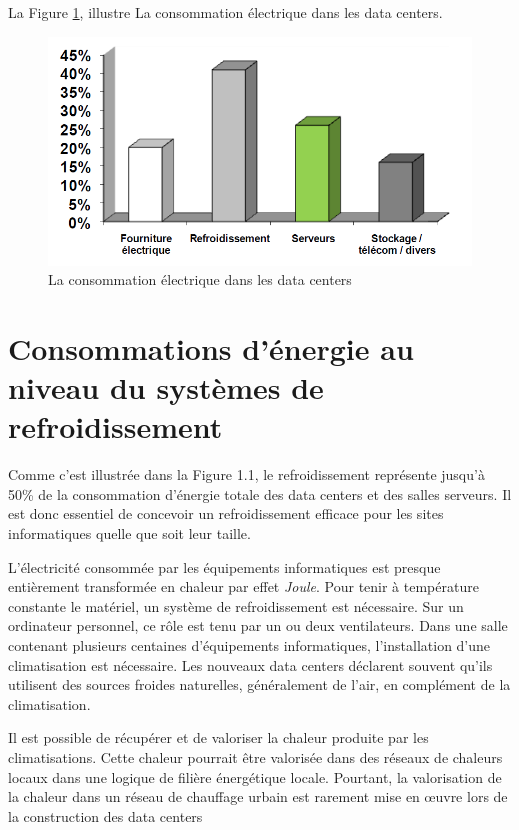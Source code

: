 La Figure \ref{Cdatacenters}, illustre La consommation électrique dans les data centers.
\begin{figure}[!h]
\begin{center}
\includegraphics[scale=0.5]{figures/1.png} 
\end{center}
\caption{La consommation électrique dans les data centers}
\label{Cdatacenters}
\end{figure}

\section{Consommations d'énergie au niveau du systèmes de refroidissement}
\begin{onehalfspace}
Comme c'est illustrée dans la Figure 1.1, le refroidissement représente jusqu'à 50\% de la consommation d'énergie totale des data centers et des salles serveurs. Il est donc essentiel de concevoir un refroidissement efficace pour les sites informatiques quelle que soit leur taille.\medskip 

L'électricité consommée par les équipements informatiques est presque entièrement transformée en chaleur
par effet \textit{Joule}. Pour tenir à température constante le matériel, un système de refroidissement est nécessaire.
Sur un ordinateur personnel, ce rôle est tenu par un ou deux ventilateurs. Dans une salle contenant plusieurs
centaines d'équipements informatiques, l'installation d'une climatisation est nécessaire. Les nouveaux data centers déclarent souvent qu'ils utilisent des
sources froides naturelles, généralement de l'air, en complément de la climatisation.\medskip 

Il est possible de récupérer et de valoriser la chaleur produite par les climatisations. Cette chaleur pourrait
être valorisée dans des réseaux de chaleurs locaux dans une logique de filière énergétique locale. Pourtant,
la valorisation de la chaleur dans un réseau de chauffage urbain est rarement mise en œuvre lors de la
construction des data centers
\end{onehalfspace}

